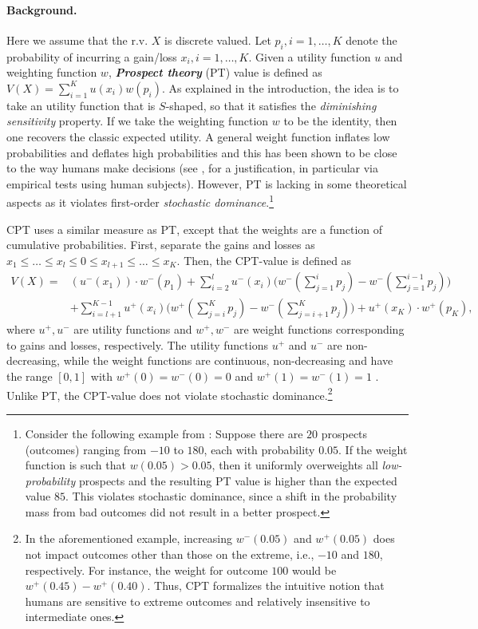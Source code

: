 \paragraph{Background.}
Here we assume that the r.v. $X$ is discrete valued.
Let $p_i, i=1,\ldots,K$ denote the probability of incurring a gain/loss $x_i, i=1,\ldots,K$. %
Given a utility function $u$ and weighting function $w$, \textit{\textbf{Prospect theory}} (PT) value is defined as $V(X) = \sum_{i=1}^K u(x_i) w(p_i)$. 
As explained in the introduction, the idea is to take an utility function that is $S$-shaped, so that it satisfies the \textit{diminishing sensitivity}  property. 
If we take the weighting function $w$ to be the identity, then one recovers the classic expected utility. A general weight function inflates low probabilities and deflates high probabilities and this has been shown to be close to the way humans make decisions (see \cite{kahneman1979prospect}, \cite{fennema1997original} for a justification, in particular via empirical tests using human subjects).
However, PT is lacking in some theoretical aspects as it violates first-order \textit{stochastic dominance}.\footnote{Consider the following example from \cite{fennema1997original}: Suppose there are $20$ prospects (outcomes) ranging from $-10$ to $180$, each with probability $0.05$. If the weight function is such that $w(0.05) > 0.05$, then it uniformly overweights all \textit{low-probability} prospects and the resulting PT value is higher than the expected value $85$. This violates stochastic dominance, since a shift in the probability mass from bad outcomes did not result in a better prospect.}

CPT uses a similar measure as PT, except that the weights are a function of cumulative probabilities. First, separate the gains and losses as 
$x_1\le \ldots \le x_l \le 0 \le x_{l+1} \le \ldots \le x_K$. Then, the CPT-value is defined as 
\begin{align}
\label{eq:cpt-discrete}
V(X) = &(u^-(x_1))\cdot w^-(p_1) 
+\sum_{i=2}^l u^-(x_i) \Big(w^-(\sum_{j=1}^i p_j) - w^-(\sum_{j=1}^{i-1} p_j)\Big) 
\\&
 + \sum_{i=l+1}^{K-1} u^+(x_i) \Big(w^+(\sum_{j=i}^K p_j) - w^-(\sum_{j=i+1}^K p_j) \Big)
 + u^+(x_K)\cdot w^+(p_K), 
\end{align} 
where $u^+, u^-$ are utility functions and $w^+, w^-$ are weight functions corresponding to gains and losses, respectively. The utility functions $u^+$ and $u^-$ are non-decreasing, while the weight functions are continuous, non-decreasing and have the range $[0,1]$ with $w^+(0)=w^-(0)=0$ and $w^+(1)=w^-(1)=1$ . 
Unlike PT, the CPT-value does not violate stochastic dominance.\footnote{In the aforementioned example, increasing $w^-(0.05)$ and $w^+(0.05)$ does not impact outcomes other than those on the extreme, i.e., $-10$ and $180$, respectively. For instance, the weight for outcome $100$ would be $w^+(0.45) - w^+(0.40)$. Thus, CPT formalizes the intuitive notion that humans are sensitive to extreme outcomes and relatively insensitive to intermediate ones.}


